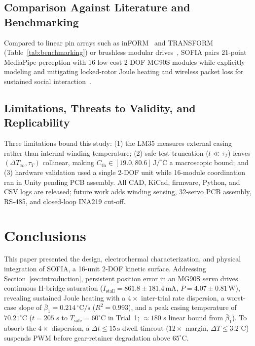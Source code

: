 \documentclass[lettersize,journal]{IEEEtran}
\begin{document}
	\subsection{Comparison Against Literature and Benchmarking}
	\label{sec:disc_comparison}
	
	Compared to linear pin arrays such as inFORM~\cite{follmer2013inform} and TRANSFORM~\cite{ishii2015transform} (Table~\ref{tab:benchmarking}) or brushless modular drives~\cite{seo2019modular}, SOFIA pairs 21-point MediaPipe perception with 16 low-cost 2-DOF MG90S modules while explicitly modeling and mitigating locked-rotor Joule heating and wireless packet loss for sustained social interaction~\cite{fong2003social}.
	
	\subsection{Limitations, Threats to Validity, and Replicability}
	\label{sec:disc_limitations}
	
	Three limitations bound this study: (1) the LM35 measures external casing rather than internal winding temperature; (2) safe test truncation ($t \ll \tau_T$) leaves $(\Delta T_\infty, \tau_T)$ collinear, making $C_{\text{th}} \in [19.0, 80.6]\,\text{J/}^\circ\text{C}$ a macroscopic bound; and (3) hardware validation used a single 2-DOF unit while 16-module coordination ran in Unity pending PCB assembly. All CAD, KiCad, firmware, Python, and CSV logs are released; future work adds winding sensing, 32-servo PCB assembly, RS-485, and closed-loop INA219 cut-off.
	
	\section{Conclusions}
	\label{sec:conclusions}
	
	This paper presented the design, electrothermal characterization, and physical integration of SOFIA, a 16-unit 2-DOF kinetic surface. Addressing Section~\ref{sec:introduction}, persistent position error in an MG90S servo drives continuous H-bridge saturation ($\bar{I}_{\text{stall}} = 861.8 \pm 181.4\,\text{mA}$, $\bar{P} = 4.07 \pm 0.81\,\text{W}$),
	revealing sustained Joule heating with a $4\times$ inter-trial rate dispersion, a worst-case slope of
	$\bar{\beta}_1 = 0.214\,^\circ\text{C/s}$ ($R^2 = 0.993$), and a peak casing temperature of $70.21^\circ\text{C}$ ($t = 205\text{ s}$ to $T_{\text{safe}} = 60^\circ\text{C}$ in Trial~1; $\approx 180\text{ s}$ linear bound from $\bar{\beta}_1$). To absorb the $4\times$ dispersion, a $\Delta t \le 15\,\text{s}$ dwell timeout ($12\times$ margin, $\Delta T \le 3.2^\circ\text{C}$) suspends PWM before gear-retainer degradation above $65^\circ\text{C}$.
	
\end{document}
